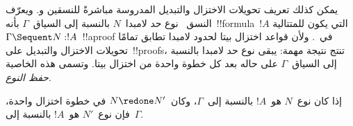 \documentclass[../../../include/open-logic-section]{subfiles}
\begin{document}


يمكن كذلك تعريف تحويلات الاختزال والتبديل المدروسة مباشرةً للنسقين
 و. ويعرّف النسق~ نوع حد لامبدا~$N$ بالنسبة
إلى السياق~$\Gamma$ بأنه~!!{formula}~$!A$ التي يكون للمتتالية
$\Gamma\Sequent N:!A$~!!a{proof} في~. ولأن قواعد اختزال بيتا
لحدود لامبدا تطابق تمامًا تحويلات الاختزال والتبديل على~!!{proof}s، تنتج
نتيجة مهمة: يبقى نوع حد لامبدا بالنسبة إلى السياق~$\Gamma$ على حاله بعد
كل خطوة واحدة من اختزال بيتا. وتسمى هذه الخاصية \emph{حفظ النوع}.

\begin{prop}
إذا كان نوع~$N$ هو~$!A$ بالنسبة إلى~$\Gamma$، وكان~$N\redone N'$ في خطوة
اختزال واحدة، فإن نوع~$N'$ هو~$!A$ بالنسبة إلى~$\Gamma$.
\end{prop}
\end{document}
